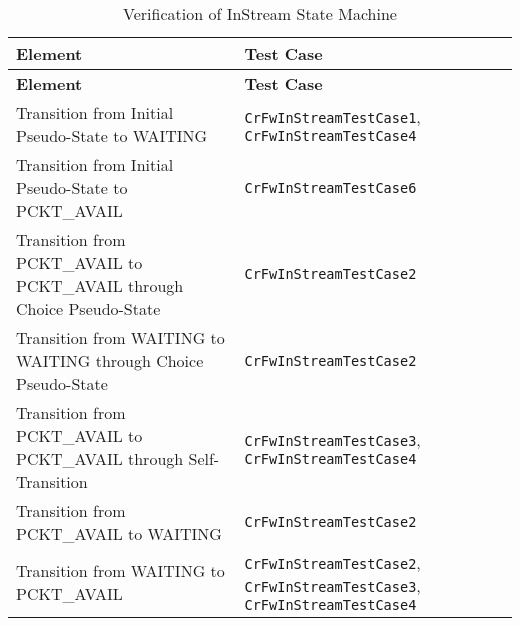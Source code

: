 \documentclass{pnp_article}
\begin{document}
\begin{longtable}{|>{\raggedright}p{8.0cm}|P{5.0cm}|}
\caption{Verification of InStream State Machine}
\label{tab:verInStreamSM}\\
\hline
{}
\textbf{Element} & \textbf{Test Case} \\
\hline
\endfirsthead
{}
\textbf{Element} & \textbf{Test Case} \\
\hline
\endhead
Transition from Initial Pseudo-State to WAITING  & \texttt{CrFwInStreamTestCase1}, \texttt{CrFwInStreamTestCase4}\\
\hline
Transition from Initial Pseudo-State to PCKT\_AVAIL  & \texttt{CrFwInStreamTestCase6}\\
\hline
Transition from PCKT\_AVAIL to PCKT\_AVAIL through Choice Pseudo-State  & \texttt{CrFwInStreamTestCase2}\\
\hline
Transition from WAITING to WAITING through Choice Pseudo-State  & \texttt{CrFwInStreamTestCase2}\\
\hline
Transition from PCKT\_AVAIL to PCKT\_AVAIL through Self-Transition  & \texttt{CrFwInStreamTestCase3}, \texttt{CrFwInStreamTestCase4}\\
\hline
Transition from PCKT\_AVAIL to WAITING  & \texttt{CrFwInStreamTestCase2}\\
\hline
Transition from WAITING to PCKT\_AVAIL  & \texttt{CrFwInStreamTestCase2}, \texttt{CrFwInStreamTestCase3}, \texttt{CrFwInStreamTestCase4}\\
\hline
\end{longtable}
\end{document}
